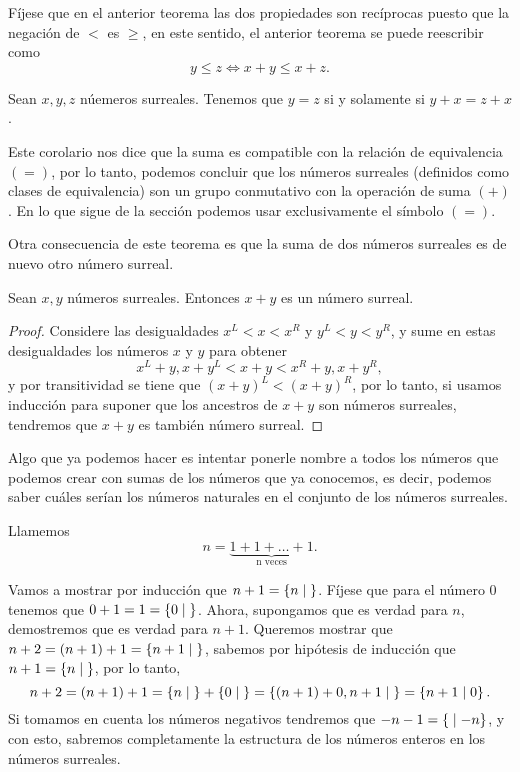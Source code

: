     F\'ijese que en el anterior teorema las dos propiedades son rec\'iprocas puesto que la negaci\'on de $<$ es $\ge$, en este sentido, el anterior teorema se puede reescribir como 
    \[
        y \le z \Leftrightarrow x+y\le x+z.
    \]

    \begin{corollary}
        Sean $x, y, z$ n\'uemeros surreales. Tenemos que $y=z$ si y solamente si $y+x=z+x$.
    \end{corollary}

    Este corolario nos dice que la suma es compatible con la relaci\'on de equivalencia $(=)$, por lo tanto, podemos concluir que los n\'umeros surreales (definidos como clases de equivalencia) son un grupo conmutativo con la operaci\'on de suma $(+)$. En lo que sigue de la secci\'on podemos usar exclusivamente el s\'imbolo $(=)$.

    Otra consecuencia de este teorema es que la suma de dos n\'umeros surreales es de nuevo otro n\'umero surreal.

    \begin{corollary}
        Sean $x, y$ n\'umeros surreales. Entonces $x + y$ es un n\'umero surreal.
    \end{corollary}

    \begin{proof}
        Considere las desigualdades $x^L < x < x^R$ y $y^L < y < y^R$, y sume en estas desigualdades los n\'umeros $x$ y $y$ para obtener
        \[
            x^L + y, x + y^L < x+y < x^R + y, x + y^R,
        \]
        y por transitividad se tiene que $(x+y)^L < (x+y)^R$, por lo tanto, si usamos inducci\'on para suponer que los ancestros de $x+y$ son n\'umeros surreales, tendremos que $x+y$ es tambi\'en n\'umero surreal.
    \end{proof}
    
    Algo que ya podemos hacer es intentar ponerle nombre a todos los n\'umeros que podemos crear con sumas de los n\'umeros que ya conocemos, es decir, podemos saber cu\'ales ser\'ian los n\'umeros naturales en el conjunto de los n\'umeros surreales.

    \begin{example}
        Llamemos 
        \[
            n = \underbrace{1+1+\dots+1}_{\text{n veces}}.
        \]

        Vamos a mostrar por inducci\'on que $n+1 = \left\{n\;\middle|\; \right\}$. F\'ijese que para el n\'umero $0$ tenemos que $0+1 = 1 = \left\{0\;\middle|\; \right\}$. Ahora, supongamos que es verdad para $n$, demostremos que es verdad para $n+1$. Queremos mostrar que $n+2 = (n+1)+1 = \left\{n+1\;\middle|\; \right\}$, sabemos por hip\'otesis de inducci\'on que $n+1 = \left\{n\;\middle|\; \right\}$, por lo tanto,
        \[
            n+2 = (n+1)+1 = \left\{n\;\middle|\; \right\} + \left\{0\;\middle|\; \right\} = \left\{(n+1)+0, n+1\;\middle|\; \right\} = \left\{n+1\;\middle|\; 0\right\}.
        \]
        Si tomamos en cuenta los n\'umeros negativos tendremos que $-n-1 = \left\{\;\middle|\; -n\right\}$, y con esto, sabremos completamente la estructura de los n\'umeros enteros en los n\'umeros surreales.
    \end{example}

